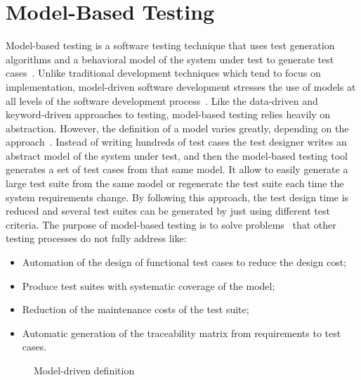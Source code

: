 \section{Model-Based Testing}

Model-based testing is a software testing technique that uses test generation algorithms and a behavioral model of the system under test to generate test cases~\cite{1200168}. Unlike traditional development techniques which tend to focus on implementation, model-driven software development
stresses the use of models at all levels of the software
development process~\cite{5381477}. Like the data-driven and keyword-driven approaches to testing, model-based testing relies heavily on abstraction. However, the definition of a model varies greatly, depending on the approach~\cite{Jääskeläinen2008}. Instead of writing hundreds of test cases the test designer writes an abstract model of the system under test, and then the model-based testing tool generates a set of test cases from that same model. It allow to easily generate a large test suite from the same model or regenerate the test suite each time the system requirements change. By following this approach, the test design time is reduced and several test suites can be generated by just using different test criteria. The purpose of model-based testing is to solve problems~\cite{1200168} that other testing processes do not fully address like:
\begin{itemize}
\item Automation of the design of functional test cases to reduce the design cost;
\item Produce test suites with systematic coverage of the model;
\item Reduction of the maintenance costs of the test suite;
\item Automatic generation of the traceability matrix from requirements to test cases.
\end{itemize}

\begin{figure}[!ht]
\centering
{}
\caption{Model-driven definition} \label{fig:f3}
\end{figure}

